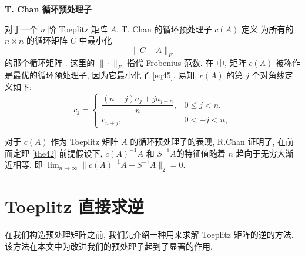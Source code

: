\documentclass{ecnumaster}
\begin{document}

\medskip
\noindent\textbf{T. Chan 循环预处理子}

对于一个 $n$ 阶 Toeplitz 矩阵 $A$, T. Chan 的循环预处理子 $c(A)$ 定义
为所有的 $n \times n$ 的循环矩阵 $C$ 中最小化
\begin{equation}\label{eq45}
  \| C - A \|_F
\end{equation}
的那个循环矩阵 \cite{C88}.
这里的 $\| \cdot \|_F$ 指代 Frobenius 范数.
在 \cite{C88} 中, 矩阵 $c(A)$ 被称作是最优的循环预处理子,
因为它最小化了 \eqref{eq45}.
易知, $c(A)$ 的第 $j$ 个对角线定义如下:
\begin{equation}
  c_j =
  \begin{cases}
    \dfrac{(n-j)a_j + ja_{j-n}}{n}, & 0 \leq j < n,\\
    c_{n+j}, & 0 < -j < n,
  \end{cases}
\end{equation}

对于 $c(A)$ 作为 Toeplitz 矩阵 $A$ 的循环预处理子的表现,
R.Chan \cite{C890} 证明了,
在前面定理 \ref{the42} 前提假设下,
$c(A)^{-1}A$ 和 $S^{-1}A$的特征值随着 $n$ 趋向于无穷大渐近相等,
即 $\lim_{n\to \infty} \| c(A)^{-1}A - S^{-1}A \|_2 = 0$.

\section{Toeplitz 直接求逆}
在我们构造预处理矩阵之前,
我们先介绍一种用来求解 Toeplitz 矩阵的逆的方法.
该方法在本文中为改进我们的预处理子起到了显著的作用.

\end{document}
